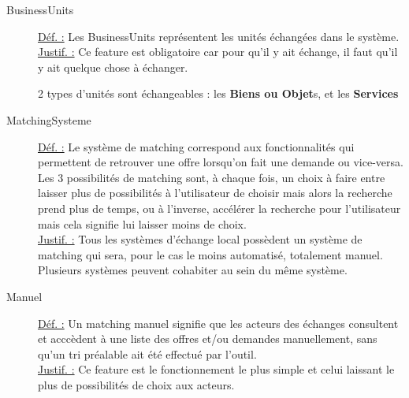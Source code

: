 \begin{description}
\item [BusinessUnits]
\underline{Déf. :}  Les BusinessUnits représentent les unités échangées dans le système.
\\ \underline{Justif. :}  Ce feature est obligatoire car pour qu'il y ait échange,  il faut qu'il y ait quelque chose à échanger.
\newline

2 types d'unités sont échangeables : les \textbf{Biens ou Objet}s,  et les \textbf{Services}

%

\item [MatchingSysteme]
\underline{Déf. :}  Le système de matching correspond aux fonctionnalités qui permettent de retrouver une offre lorsqu'on fait une demande ou vice-versa.  Les 3 possibilités de matching sont,  à chaque fois,  un choix à faire entre laisser plus de possibilités à l'utilisateur de choisir mais alors la recherche prend plus de temps,  ou à l'inverse,  accélérer la recherche pour l'utilisateur mais cela signifie lui laisser moins de choix.
\\ \underline{Justif. :}  Tous les systèmes d'échange local possèdent un système de matching qui sera,  pour le cas le moins automatisé,  totalement manuel.  Plusieurs systèmes peuvent cohabiter au sein du même système.
\newline

\item [Manuel]
\underline{Déf. :}  Un matching manuel signifie que les acteurs des échanges consultent et acccèdent à une liste des offres et/ou demandes manuellement,  sans qu'un tri préalable ait été effectué par l'outil.
\\ \underline{Justif. :} Ce feature est le fonctionnement le plus simple et celui laissant le plus de possibilités de choix aux acteurs. 
\newline


\end{description}
